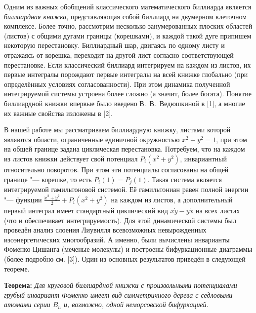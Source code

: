 
\vzmscaption
Одним из важных обобщений классического математического биллиарда является \textit{биллиардная книжка}, представляющая собой биллиард на двумерном клеточном комплексе. Более точно, рассмотрим несколько занумерованных плоских областей (листов) с общими дугами границы (корешками), и каждой такой дуге припишем некоторую перестановку. Биллиардный шар, двигаясь по одному листу и отражаясь от корешка, переходит на другой лист согласно соответствующей перестановке. Если классический биллиард интегрируем на каждом из листов, их первые интегралы порождают первые интегралы на всей книжке глобально (при определённых условиях согласованности). При этом динамика полученной интегрируемой системы устроена более сложно (а значит, более богата). Понятие биллиардной книжки впервые было введено В.~В.~Ведюшкиной в [1], а многие их важные свойства изложены в [2].

В нашей работе мы рассматриваем биллиардную книжку, листами которой являются области, ограниченные единичной окружностью $x^2+y^2=1$, при этом на общей границе задана циклическая перестановка. Потребуем, что на каждом из листов книжки действует свой потенциал $P_i(x^2+y^2)$, инвариантный относительно поворотов. При этом эти потенциалы согласованы на общей границе "--- корешке, то есть $P_i(1)=P_j(1)$. Такая система является интегрируемой гамильтоновой системой. Её гамильтониан равен полной энергии "--- функции $\frac{\dot{x}^2+\dot{y}^2}{2}+P_i(x^2+y^2)$ на каждом из листов, а дополнительный первый интеграл имеет стандартный циклический вид $x\dot y-y \dot x$ на всех листах (что и обеспечивает интегрируемость). Для этой динамической системы был проведён анализ слоения Лиувилля всевозможных невырожденных изоэнергетических многообразий. А именно, были вычислены инварианты Фоменко-Цишанга (меченые молекулы) и построены бифуркационные диаграммы (более подробно см. [3]). Один из основных результатов приведён в следующей теореме.

\textbf{Теорема:}
	\textit{Для круговой биллиардной книжки с произвольными потенциалами грубый инвариант Фоменко имеет вид симметричного дерева с седловыми атомами серии $B_n$ и, возможно, одной неморсовской бифуркацией.}

